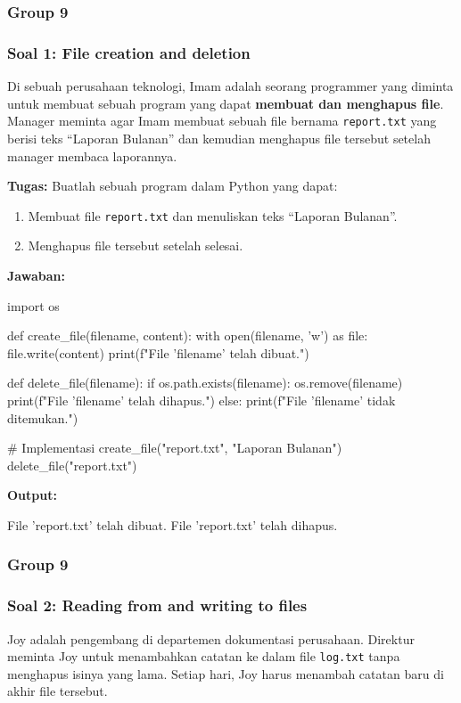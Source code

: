 \documentclass[12pt]{article}
\begin{document}
\subsubsection{Group 9}
\subsubsection*{Soal 1: File creation and deletion}
Di sebuah perusahaan teknologi, Imam adalah seorang programmer yang diminta untuk membuat sebuah program yang dapat \textbf{membuat dan menghapus file}. Manager meminta agar Imam membuat sebuah file bernama \texttt{report.txt} yang berisi teks ``Laporan Bulanan'' dan kemudian menghapus file tersebut setelah manager membaca laporannya.

\textbf{Tugas:} Buatlah sebuah program dalam Python yang dapat:
\begin{enumerate}
    \item Membuat file \texttt{report.txt} dan menuliskan teks ``Laporan Bulanan''.
    \item Menghapus file tersebut setelah selesai.
\end{enumerate}

\textbf{Jawaban:}
\begin{python}
import os

def create_file(filename, content):
    with open(filename, 'w') as file:
        file.write(content)
    print(f"File '{filename}' telah dibuat.")

def delete_file(filename):
    if os.path.exists(filename):
        os.remove(filename)
        print(f"File '{filename}' telah dihapus.")
    else:
        print(f"File '{filename}' tidak ditemukan.")

# Implementasi
create_file("report.txt", "Laporan Bulanan")
delete_file("report.txt")
\end{python}

\textbf{Output:}
\begin{python}
File 'report.txt' telah dibuat.
File 'report.txt' telah dihapus.
\end{python}

\subsubsection{Group 9}
\subsubsection*{Soal 2: Reading from and writing to files}
Joy adalah pengembang di departemen dokumentasi perusahaan. Direktur meminta Joy untuk menambahkan catatan ke dalam file \texttt{log.txt} tanpa menghapus isinya yang lama. Setiap hari, Joy harus menambah catatan baru di akhir file tersebut.
\end{document}
